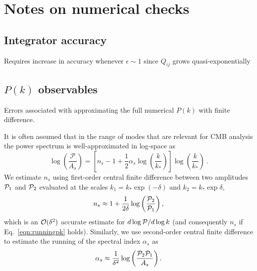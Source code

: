 \documentclass[11pt]{article}
\def\calP{{\cal P}}
\def\calO{{\cal O}}
\begin{document}
\section{Notes on numerical checks}

\subsection{Integrator accuracy}

Requires increase in accuracy whenever $\epsilon \sim 1$ since $Q_{ij}$ grows quasi-exponentially

\subsection{$P(k)$ observables}

Errors associated with approximating the full numerical $P(k)$ with finite difference.

It is often assumed that in the range of modes that are relevant for CMB analysis the power spectrum is well-approximated in log-space as
\begin{equation}
  \log \left( \frac{\mathcal P}{A_s} \right) = \left[ n_s - 1 + \frac{1}{2} \alpha_s \log \left( \frac{k}{k_*} \right) \right]\log \left( \frac{k}{k_*} \right) \, .
  \label{eqn:runningpk}
\end{equation}
We estimate $n_s$ using first-order central finite difference between two amplitudes $\calP_1$ and $\calP_2$ evaluated at the scales $k_1 = k_* \exp (-\delta)$ and $k_2= k_* \exp \delta$,
\begin{equation}
  n_s \approx 1 + \frac{1}{2\delta}\log \left( \frac{ \calP_2 }{ \calP_1} \right),
  \label{eqn:nsapprox}
\end{equation}
which is an $\calO(\delta^2)$ accurate estimate for $d\log \calP/d \log k$ (and consequently $n_s$ if Eq.~\eqref{eqn:runningpk} holds).  Similarly, we use second-order central finite difference to estimate the running of the spectral index $\alpha_s$ as
\begin{equation}
  \alpha_s \approx \frac{1}{\delta^2} \log \left( \frac{\calP_2 \calP_1}{A_s} \right).
  \label{eqn:alphaapprox}
\end{equation}
\end{document}
